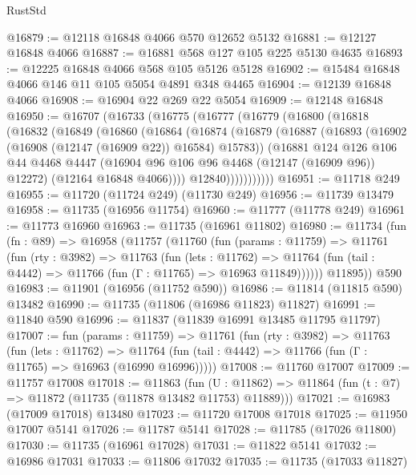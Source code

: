 \begin{lexlean}{RustStd}
\begin{coremodule}
@16879 := @12118 @16848 @4066 @570 @12652 @5132
@16881 := @12127 @16848 @4066
@16887 := @16881 @568 @127 @105 @225 @5130 @4635
@16893 := @12225 @16848 @4066 @568 @105 @5126 @5128
@16902 := @15484 @16848 @4066 @146 @11 @105 @5054 @4891 @348 @4465
@16904 := @12139 @16848 @4066
@16908 := @16904 @22 @269 @22 @5054
@16909 := @12148 @16848
@16950 := @16707
    (@16733
      (@16775
        (@16777
          (@16779
            (@16800
              (@16818
                (@16832
                  (@16849
                    (@16860
                      (@16864
                        (@16874
                          (@16879
                            (@16887
                              (@16893 (@16902 (@16908 (@12147 (@16909 @22)) @16584) @15783))
                              (@16881
                                @124
                                @126
                                @106
                                @44
                                @4468
                                @4447
                                (@16904 @96 @106 @96 @4468 (@12147 (@16909 @96)) @12272)
                                (@12164 @16848 @4066))))
                          @12840)))))))))))
@16951 := @11718 @249
@16955 := @11720 (@11724 @249) (@11730 @249)
@16956 := @11739 @13479
@16958 := @11735 (@16956 @11754)
@16960 := @11777 (@11778 @249)
@16961 := @11773 @16960
@16963 := @11735 (@16961 @11802)
@16980 := @11734
    (fun (fn : @89) =>
    @16958
      (@11757
        (@11760
          (fun (params : @11759) =>
          @11761
            (fun (rty : @3982) =>
            @11763
              (fun (lets : @11762) =>
              @11764 (fun (tail : @4442) => @11766 (fun (Γ : @11765) => @16963 @11849))))))
        @11895))
    @590
@16983 := @11901 (@16956 (@11752 @590))
@16986 := @11814 (@11815 @590) @13482
@16990 := @11735 (@11806 (@16986 @11823) @11827)
@16991 := @11840 @590
@16996 := @11837 (@11839 @16991 @13485 @11795 @11797)
@17007 := fun (params : @11759) =>
  @11761
    (fun (rty : @3982) =>
    @11763
      (fun (lets : @11762) =>
      @11764 (fun (tail : @4442) => @11766 (fun (Γ : @11765) => @16963 (@16990 @16996)))))
@17008 := @11760 @17007
@17009 := @11757 @17008
@17018 := @11863
    (fun (U : @11862) => @11864 (fun (t : @7) => @11872 (@11735 (@11878 @13482 @11753) @11889)))
@17021 := @16983 (@17009 @17018) @13480
@17023 := @11720 @17008 @17018
@17025 := @11950 @17007 @5141
@17026 := @11787 @5141
@17028 := @11785 (@17026 @11800)
@17030 := @11735 (@16961 @17028)
@17031 := @11822 @5141
@17032 := @16986 @17031
@17033 := @11806 @17032
@17035 := @11735 (@17033 @11827)

\end{coremodule}
\end{lexlean}
